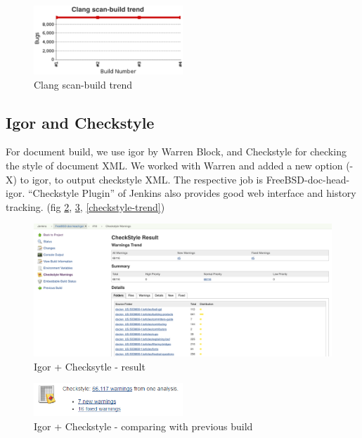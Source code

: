 \documentclass[a4paper,twocolumn,10pt]{article}
\begin{document}
\begin{figure}
\centering
\includegraphics[width=0.5\textwidth]{clang-scan-build-trend.png}
\caption{Clang scan-build trend}
\label{clang-scan-build-trend}
\end{figure}

\subsection{Igor and Checkstyle}

For document build, we use igor \cite{igor} by Warren Block, and Checkstyle
\cite{checkstyle} for checking the style of document XML. We worked with Warren
and added a new option (-X) to igor, to output checkstyle XML. The respective
job is FreeBSD-doc-head-igor.  ``Checkstyle Plugin''
\cite{jenkins-checkstyle-plugin} of Jenkins also provides good web interface
and history tracking. (fig \ref{checkstyle-result}, \ref{checkstyle-compare},
\ref{checkstyle-trend})

\begin{figure}
\includegraphics[width=\textwidth]{checkstyle-result.png}
\caption{Igor + Checksytle - result}
\label{checkstyle-result}
\end{figure}

\begin{figure}
\centering
\includegraphics[width=0.5\textwidth]{checkstyle-compare.png}
\caption{Igor + Checkstyle - comparing with previous build}
\label{checkstyle-compare}
\end{figure}
\end{document}
